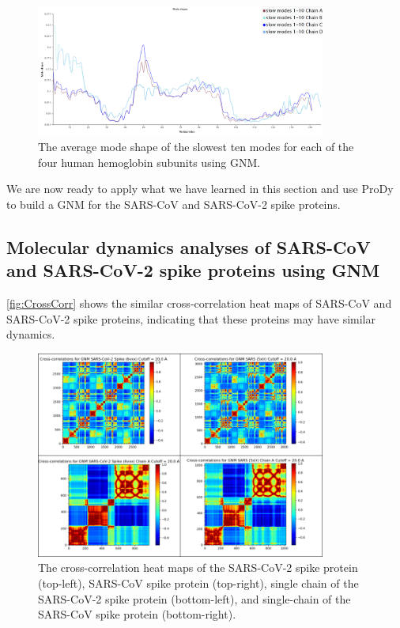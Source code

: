 \begin{figure}[h]
	\centering
	\mySfFamily
	\includegraphics[width = 0.85\textwidth]{../images/hemoglobin_mode_shape_avg.png}
	\caption{The average mode shape of the slowest ten modes for each of the four human hemoglobin subunits using GNM.}
	\label{fig:hemoglobin_mode_shape_avg}
\end{figure}

We are now ready to apply what we have learned in this section and use ProDy to build a GNM for the SARS-CoV and SARS-CoV-2 spike proteins. 

\FloatBarrier
{}
\subsection{Molecular dynamics analyses of SARS-CoV and SARS-CoV-2 spike proteins using GNM}

\autoref{fig:CrossCorr} shows the similar cross-correlation heat maps of SARS-CoV and SARS-CoV-2 spike proteins, indicating that these proteins may have similar dynamics.\\

\begin{figure}[h]
	\centering
	\mySfFamily
	\includegraphics[width = 0.85\textwidth]{../images/CrossCorr.png}
	\caption{The cross-correlation heat maps of the SARS-CoV-2 spike protein (top-left), SARS-CoV spike protein (top-right), single chain of the SARS-CoV-2 spike protein (bottom-left), and single-chain of the SARS-CoV spike protein (bottom-right).}
	\label{fig:CrossCorr}
\end{figure}

